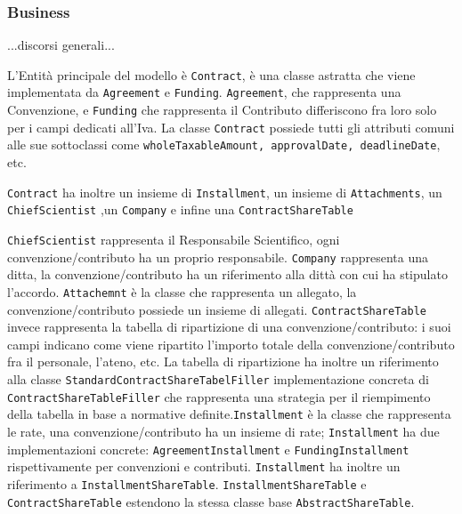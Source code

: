 \subsubsection{Business}

...discorsi generali...

L'Entità principale del modello è \texttt{Contract}, è una classe astratta che viene implementata da \texttt{Agreement} e \texttt{Funding}.
\texttt{Agreement}, che rappresenta una Convenzione, e \texttt{Funding} che rappresenta il Contributo differiscono fra loro solo per i campi dedicati all'Iva. La classe \texttt{Contract} possiede
tutti gli attributi comuni alle sue sottoclassi come \texttt{wholeTaxableAmount, approvalDate, deadlineDate}, etc.


\texttt{Contract} ha inoltre un insieme di \texttt{Installment}, un insieme di \texttt{Attachments}, un \texttt{ChiefScientist}
,un \texttt{Company} e infine una \texttt{ContractShareTable}

\texttt{ChiefScientist} rappresenta il Responsabile Scientifico, ogni convenzione/contributo ha un proprio responsabile.
\texttt{Company} rappresenta una ditta, la convenzione/contributo ha un riferimento alla dittà con cui ha stipulato l'accordo.
\texttt{Attachemnt} è la classe che rappresenta un allegato, la convenzione/contributo possiede un insieme di allegati.
\texttt{ContractShareTable} invece rappresenta la tabella di ripartizione di una convenzione/contributo: i suoi campi indicano come viene ripartito l'importo totale della convenzione/contributo fra il personale, l'ateno, etc.
La tabella di ripartizione ha inoltre un riferimento alla classe \texttt{StandardContractShareTabelFiller} implementazione concreta di \texttt{ContractShareTableFiller} che rappresenta una strategia per il riempimento della tabella in base
a normative definite.\texttt{Installment} è la classe che rappresenta le rate, una convenzione/contributo ha un insieme di rate; \texttt{Installment} ha due implementazioni concrete: \texttt{AgreementInstallment} e \texttt{FundingInstallment} rispettivamente
per convenzioni e contributi. \texttt{Installment} ha inoltre un riferimento a \texttt{InstallmentShareTable}. \texttt{InstallmentShareTable} e \texttt{ContractShareTable} estendono la stessa classe base \texttt{AbstractShareTable}.



